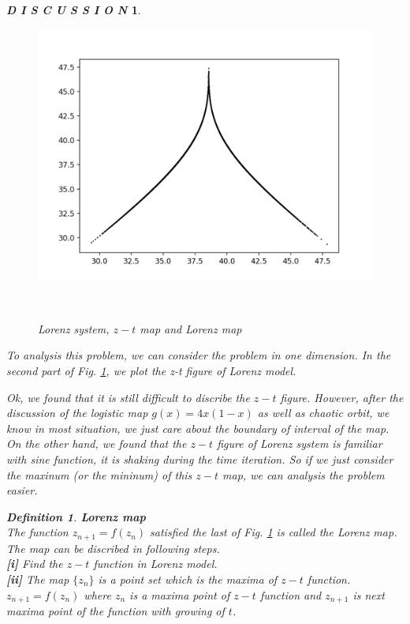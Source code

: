 \documentclass[12pt]{article}
\theoremstyle{plain}
\newtheorem{definition}{\textbf{Definition}}[section]
\newtheorem{discussion}{\textit{D I S C U S S I O N}}[section]
\begin{document}
\begin{discussion}
\begin{figure}[H]
\begin{minipage}[c][0.29\width]{0.29\textwidth}
   \includegraphics[width=\textwidth]{figure/section2/Lorenz-map.png}
\end{minipage}
\\[3ex]\caption{Lorenz system, $z-t$ map and Lorenz map}\label{Lorenz-map}
\end{figure}


To analysis this problem, we can consider the problem in one dimension. In the second part of Fig. \ref{Lorenz-map}, we plot the z-t figure of Lorenz model. 

Ok, we found that it is still difficult to discribe the $z-t$ figure. However, after the discussion of the logistic map $g(x) = 4x(1-x)$ as well as chaotic orbit, we know in most situation, we just care about the boundary of interval of the map. On the other hand, we found that the $z-t$ figure of Lorenz system is familiar with sine function, it is shaking during the time iteration. So if we just consider the maxinum (or the mininum) of this $z-t$ map, we can analysis the problem easier.

\begin{definition}\textbf{Lorenz map}
\\\noindent The function $z_{n+1} = f(z_n)$ satisfied the last of Fig. \ref{Lorenz-map} is called the Lorenz map. The map can be discribed in following steps.
\\\noindent \textbf{[i]} Find the $z-t$ function in Lorenz model.
\\\noindent \textbf{[ii]} The map $\{z_n\}$ is a point set which is the maxima of $z-t$ function. $z_{n+1} = f(z_n)$ where $z_{n}$ is a maxima point of $z-t$ function and $z_{n+1}$ is next maxima point of the function with growing of $t$.
\end{definition}


\end{discussion}
\end{document}
